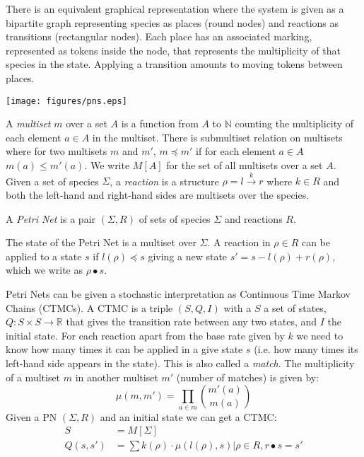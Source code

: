 \documentclass[phd]{infthesis}
\newcommand{\ie}{i.e.\xspace}
\begin{document}
There is an equivalent graphical representation where the system is given as a
bipartite graph representing species as places (round nodes) and reactions as
transitions (rectangular nodes). Each place has an associated marking,
represented as tokens inside the node, that represents the multiplicity of that
species in the state. Applying a transition amounts to moving tokens between
places.

\begin{center}
    \texttt{[image: figures/pns.eps]}
\end{center}

A \emph{multiset} $m$ over a set $A$ is a function from $A$ to $\mathbb{N}$ counting
the multiplicity of each element $a \in A$ in the multiset. There is submultiset
relation on multisets where for two multisets $m$ and $m'$, $m \preceq m'$ if for each
element $a \in A$ $m(a) \leq m'(a)$. We write $M[A]$ for the set of all multisets
over a set $A$. Given a set of species $\Sigma$, a \emph{reaction} is a structure $\rho
= l \xrightarrow{k} r$ where $k \in R$ and both the left-hand and right-hand
sides are multisets over the species. 

\begin{definition}
A \emph{Petri Net} is a pair $(\Sigma, R)$ of sets of species $\Sigma$ and reactions $R$.
\end{definition}

The state of the Petri Net is a multiset over $\Sigma$. A reaction in $\rho \in R$ can be
applied to a state $s$ if $l(\rho) \preceq s$ giving a new state $s' = s -
l(\rho) + r(\rho)$, which we write as $\rho \bullet s$.

Petri Nets can be given a stochastic interpretation as Continuous Time Markov
Chains (CTMCs). A CTMC is a triple $(S, Q, I)$ with a $S$ a set of states,
$Q: S \times S \rightarrow \mathbb{R}$ that gives the transition rate between
any two states, and $I$ the initial state. For each reaction apart from the base
rate given by $k$ we need to know how many times it can be applied in a give
state $s$ (\ie how many times its left-hand side appears in the state). This is
also called a \emph{match}. The multiplicity of a multiset $m$ in another
multiset $m'$ (number of matches) is given by:
$$
\mu(m, m') = \prod_{a \in m}  \binom{m'(a)}{m(a)}
$$
Given a PN $(\Sigma, R)$ and an initial state we can get a CTMC:
\begin{align*}
  S & = M[\Sigma] \\
  Q(s, s') &= \sum {k(\rho) \cdot \mu(l(\rho), s) | \rho \in R, r \bullet s = s'}
\end{align*}
\end{document}
